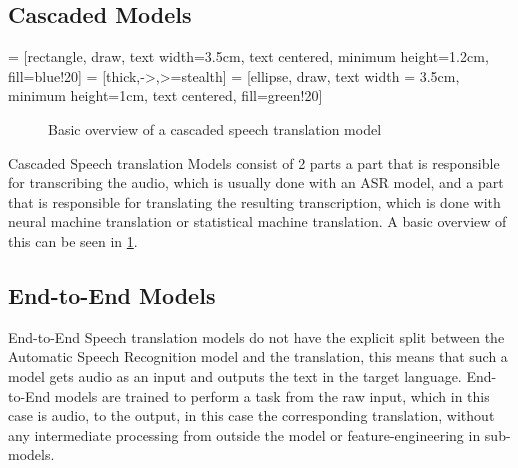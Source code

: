 
\subsection{Cascaded Models}
 = [rectangle, draw, text width=3.5cm, text centered, minimum height=1.2cm, fill=blue!20]
 = [thick,->,>=stealth]
 = [ellipse, draw, text width = 3.5cm, minimum height=1cm, text centered, fill=green!20]

\begin{figure}
    \centering
\caption{Basic overview of a cascaded speech translation model}
\label{fig:cascadedmodel}
\end{figure}
Cascaded Speech translation Models consist of 2 parts a part that is responsible for transcribing the audio, which is usually done with an ASR model, and a part that is responsible for translating the resulting transcription, which is done with neural machine translation or statistical machine translation. A basic overview of this can be seen in \ref{fig:cascadedmodel}.

\subsection{End-to-End Models}
End-to-End Speech translation models do not have the explicit split between the Automatic Speech Recognition model and the translation, this means that such a model gets audio as an input and outputs the text in the target language. 
End-to-End models are trained to perform a task from the raw input, which in this case is audio, to the output, in this case the corresponding translation, without any intermediate processing from outside the model or feature-engineering in sub-models. 
